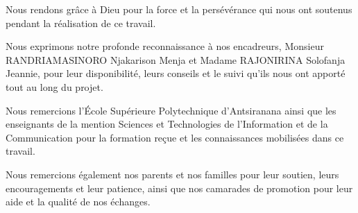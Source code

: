 \begin{remerciements}

Nous rendons grâce à Dieu pour la force et la persévérance qui nous ont soutenus pendant la réalisation de ce travail.

Nous exprimons notre profonde reconnaissance à nos encadreurs, Monsieur RANDRIAMASINORO Njakarison Menja et Madame RAJONIRINA Solofanja Jeannie, pour leur disponibilité, leurs conseils et le suivi qu'ils nous ont apporté tout au long du projet.

Nous remercions l'École Supérieure Polytechnique d'Antsiranana ainsi que les enseignants de la mention Sciences et Technologies de l'Information et de la Communication pour la formation reçue et les connaissances mobilisées dans ce travail.

Nous remercions également nos parents et nos familles pour leur soutien, leurs encouragements et leur patience, ainsi que nos camarades de promotion pour leur aide et la qualité de nos échanges.

\end{remerciements}
